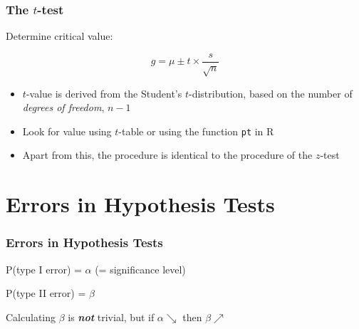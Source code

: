 \documentclass[aspectratio=169]{beamer}
\begin{document}
\begin{frame}
  \frametitle{The $t$-test}
  
  Determine critical value:
  
  \[ g = \mu \pm t \times \frac{s}{\sqrt{n}} \]
  
  \begin{itemize}
    \item $t$-value is derived from the Student's $t$-distribution, based on the number of \textit{degrees of freedom}, $n-1$
    \item Look for value using $t$-table or using the function \texttt{pt} in R
    \item Apart from this, the procedure is identical to the procedure of the $z$-test
  \end{itemize}
  
\end{frame}

\section{Errors in Hypothesis Tests}

\begin{frame}
  \frametitle{Errors in Hypothesis Tests}
  
  \begin{table}
    \centering
    \label{tab:hypfouten}
  \end{table}
  
  P(type I error) = $\alpha$ (= significance level)
  
  P(type II error) = $\beta$
  
  Calculating $\beta$ is \textbf{\textit{not}} trivial, but if $\alpha \searrow$ then $\beta \nearrow$ 
\end{frame}
\end{document}
